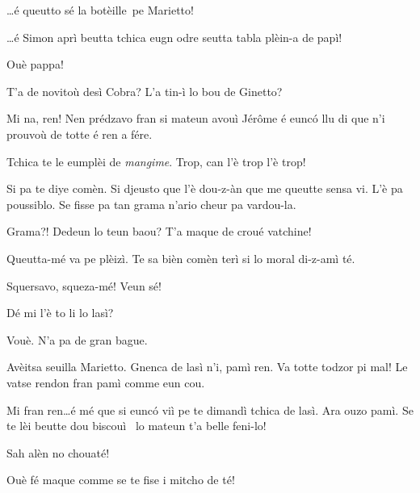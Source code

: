 \begin{drama}
\Simonspeaks \ldots é queutto sé la botèille\wine\ pe Marietto!

\Cienspeaks \ldots é Simon aprì beutta tchica eugn odre seutta tabla plèin-a de papì!

\Simonspeaks Ouè pappa!


\Mariettospeaks {} T’a de novitoù desì Cobra? L’a tin-ì lo bou de Ginetto?

\Cienspeaks Mi na, ren! Nen prédzavo fran si mateun avouì Jérôme é eunc\'o llu di que n’i prouvoù de totte é ren a fére.

\Mariettospeaks Tchica te le eumplèi de \textit{mangime}. Trop, can l’è trop l’è trop!

\Cienspeaks Si pa te diye comèn. Si djeusto que l’è dou-z-àn que me queutte sensa vi. L’è pa poussiblo. Se fisse pa tan grama n’ario cheur pa vardou-la.

\Mariettospeaks Grama?! Dedeun lo teun baou? T’a maque de croué vatchine!

\Cienspeaks {} Queutta-mé va pe plèizì. Te sa bièn comèn terì si lo moral di-z-amì té.

\Mariettospeaks Squersavo, squeza-mé! Veun sé!




\Cienspeaks Dé mi l’è to li lo lasì?

\Sahlammspeaks Vouè. N’a pa de gran bague.

\Cienspeaks Avèitsa seuilla Marietto. Gnenca de lasì n’i, pamì ren. Va totte todzor pi mal! Le vatse rendon fran pamì comme eun cou.


\Mariettospeaks Mi fran ren\ldots é mé que si eunc\'o viì pe te dimandì tchica de lasì. Ara ouzo pamì. Se te lèi beutte dou biscouì \biscotto\ lo mateun t’a belle feni-lo!


\Mariettospeaks Sah alèn no chouaté!

\Cienspeaks Ouè fé maque comme se te fise i mitcho de té!


\end{drama}
